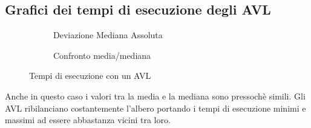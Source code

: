 \documentclass[a4paper,titlepage]{article}
\begin{document}
\subsection{Grafici dei tempi di esecuzione degli AVL }

\begin{figure}[h]
  \centering
  \begin{subfigure}{\textwidth}
    \captionsetup{justification=centering}
     \caption{Deviazione Mediana Assoluta}
     \label{fig:avl_mad}
  \end{subfigure}%
  \vspace{2pt}
  \begin{subfigure}{\textwidth}
    \captionsetup{justification=centering}
     \caption{Confronto media/mediana}
     \label{fig:avl_mean_median}
  \end{subfigure}
  \caption{Tempi di esecuzione con un AVL}
\end{figure}

Anche in questo caso i valori tra la media e la mediana sono pressochè simili.
Gli AVL ribilanciano costantemente l'albero portando i tempi di esecuzione minimi e massimi ad essere abbastanza vicini tra loro.
\newpage
\end{document}
